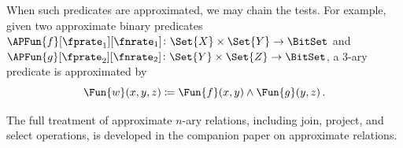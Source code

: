 \documentclass[ ../main.tex]{subfiles}
\begin{document}
When such predicates are approximated, we may chain the tests.
For example, given two approximate binary predicates $\APFun{f}[\fprate_1][\fnrate_1] \colon \Set{X} \times \Set{Y} \to \BitSet$ and $\APFun{g}[\fprate_2][\fnrate_2] \colon \Set{Y} \times \Set{Z} \to \BitSet$, a $3$-ary predicate is approximated by
\begin{equation}
	\Fun{w}(x,y,z) \coloneqq \Fun{f}(x,y) \land \Fun{g}(y,z)\,.
\end{equation}

\begin{remark}
The full treatment of approximate $n$-ary relations, including join, project, and select operations, is developed in the companion paper on approximate relations.
\end{remark}
\end{document}
